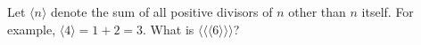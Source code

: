 Let $\langle n\rangle$ denote the sum of all positive divisors of $n$ other than $n$ itself. For example, $\langle4\rangle=1+2=3$. What is $\langle\langle\langle6\rangle\rangle\rangle$?
